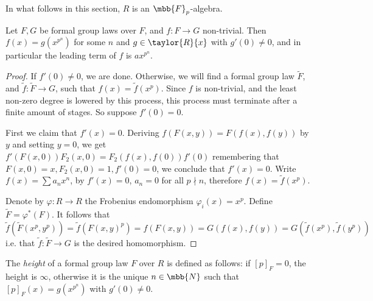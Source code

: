 In what follows in this section, $R$ is an $\mbb{F}_p$-algebra.

\begin{lemma*}
	Let $F,G$ be formal group laws over $F$, and $f: F \to G$ non-trivial.
	Then $f\left(x\right) = g\left(x^{p^n}\right)$ for some $n$ and $g\in \taylor{R}{x}$ with $g'\left(0\right) \neq 0$, and in particular the leading term of $f$ is $ax^{p^n}$.
\end{lemma*}

\begin{proof}
	If $f'\left(0\right) \neq 0$, we are done.
	Otherwise, we will find a formal group law $\tilde{F}$, and $\tilde{f}: \tilde{F} \to G$, such that $f\left(x\right) = \tilde{f}\left(x^p\right)$. Since $f$ is non-trivial, and the least non-zero degree is lowered by this process, this process must terminate after a finite amount of stages.
	So suppose $f'\left(0\right) = 0$.
	
	First we claim that $f'\left(x\right) = 0$.
	Deriving $f\left(F\left(x,y\right)\right) = F\left(f\left(x\right),f\left(y\right)\right)$ by $y$ and setting $y=0$, we get
	$
		f'\left(F\left(x,0\right)\right) F_2\left(x,0\right)
		= F_2\left(f\left(x\right),f\left(0\right)\right) f'\left(0\right)
	$
	remembering that $F\left(x,0\right) = x, F_2\left(x,0\right) = 1, f'\left(0\right) = 0$,
	we conclude that $f'\left(x\right) = 0$.
	Write $f\left(x\right) = \sum a_n x^n$,
	by $f'\left(x\right) = 0$, $a_n = 0$ for all $p \nmid n$,
	therefore $f\left(x\right) = \tilde{f}\left(x^p\right)$.
	
	Denote by $\varphi: R \to R$ the Frobenius endomorphism $\varphi_i\left(x\right) = x^p$.
	Define $\tilde{F} = \varphi^*\left(F\right)$.
	It follows that
	$
		\tilde{f}\left(\tilde{F}\left(x^p, y^p\right)\right)
		= \tilde{f}\left(F\left(x, y\right)^p\right)
		= f\left(F\left(x, y\right)\right)
		= G\left(f\left(x\right),f\left(y\right)\right)
		= G\left(\tilde{f}\left(x^p\right),\tilde{f}\left(y^p\right)\right)
	$
	i.e. that $\tilde{f}: \tilde{F} \to G$ is the desired homomorphism.
\end{proof}

\begin{definition*}
	The \emph{height} of a formal group law $F$ over $R$ is defined as follows:
	if $\left[p\right]_F = 0$, the height is $\infty$,
	otherwise it is the unique $n \in \mbb{N}$ such that $\left[p\right]_F\left(x\right) = g\left(x^{p^n}\right)$ with $g'\left(0\right) \neq 0$.
\end{definition*}


